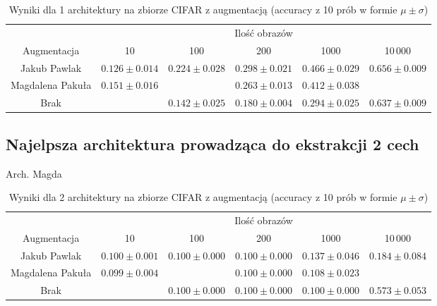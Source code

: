 \documentclass[10pt]{article}
\begin{document}
\begin{table}[H]\centering
    \begin{tabular}{cccccc}
        \toprule
                         & \multicolumn{5}{c}{Ilość obrazów}                                                                                    \\ \cmidrule{2-6}
        Augmentacja      & 10                                & 100                & 200                & 1000              & 10\,000            \\ \midrule
        Jakub Pawlak     & $0.126 \pm 0.014 $                & $0.224 \pm 0.028 $ & $0.298 \pm 0.021 $ & $0.466 \pm 0.029$ & $0.656 \pm 0.009 $ \\
        Magdalena Pakuła & $0.151 \pm 0.016 $                &                    & $0.263 \pm 0.013 $ & $0.412 \pm 0.038$                      \\
        Brak             &                                   & $0.142 \pm 0.025$  & $0.180 \pm 0.004$  & $0.294 \pm 0.025$ & $0.637 \pm 0.009$  \\
        \bottomrule
    \end{tabular}
    \caption{Wyniki dla 1 architektury na zbiorze CIFAR z augmentacją (accuracy z 10 prób w formie $\mu \pm \sigma$)}\label{tab:augmented_cifar_big}
\end{table}

\subsection*{Najelpsza architektura prowadząca do ekstrakcji 2 cech}

Arch. Magda

\begin{table}[H]\centering
    \begin{tabular}{cccccc}
        \toprule
                         & \multicolumn{5}{c}{Ilość obrazów}                                                                                    \\ \cmidrule{2-6}
        Augmentacja      & 10                                & 100                & 200                & 1000              & 10\,000            \\ \midrule
        Jakub Pawlak     & $0.100 \pm 0.001 $                & $ 0.100 \pm 0.000$ & $0.100 \pm 0.000 $ & $0.137 \pm 0.046$ & $0.184 \pm 0.084 $ \\
        Magdalena Pakuła & $0.099 \pm 0.004 $                &                    & $0.100 \pm 0.000 $ & $0.108 \pm 0.023$                      \\
        Brak             &                                   & $0.100 \pm 0.000$  & $0.100 \pm 0.000$  & $0.100 \pm 0.000$ & $0.573 \pm 0.053$  \\
        \bottomrule
    \end{tabular}
    \caption{Wyniki dla 2 architektury na zbiorze CIFAR z augmentacją (accuracy z 10 prób w formie $\mu \pm \sigma$)}\label{tab:augmented_cifar_small}
\end{table}
\end{document}
